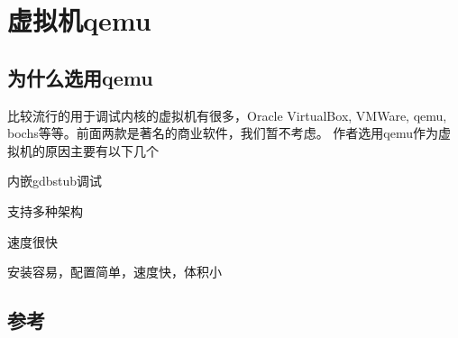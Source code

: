 \chapter{虚拟机qemu}
\section{为什么选用qemu}
比较流行的用于调试内核的虚拟机有很多，Oracle VirtualBox, VMWare, qemu, bochs等等。前面两款是著名的商业软件，我们暂不考虑。 
作者选用qemu作为虚拟机的原因主要有以下几个
\begin{compactenum}
  \item 内嵌gdbstub调试
  \item 支持多种架构
  \item 速度很快
  \item 安装容易，配置简单，速度快，体积小
\end{compactenum}
\section{参考}
